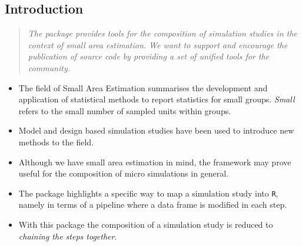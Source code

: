 \documentclass[a0,portrait]{a0poster}\usepackage[]{graphicx}\usepackage[]{color}
\newcommand{\mysec}[1]{\color{Black}\section*{#1}\color{DarkSlateGray}}
\newcommand{\code}[1]{\texttt{#1}}
\begin{document}
\begin{multicols}{2} %


\mysec{Introduction}

\begin{verse}
\textit{The package provides tools for the composition of simulation studies in the context of small area estimation. We want to support and encourage the publication of source code by providing a set of unified tools for the community.}
\end{verse}

\begin{multicols}{2}[\setlength{\columnseprule}{0pt}]

\begin{itemize}
  \item The field of Small Area Estimation summarises the development and application of statistical methods to report statistics for small groups. \textit{Small} refers to the small number of sampled units within groups.
  \item Model and design based simulation studies have been used to introduce new methods to the field.
  \item Although we have small area estimation in mind, the framework may prove useful for the composition of micro simulations in general.
  \item The package highlights a specific way to map a simulation study into \code{R}, namely in terms of a pipeline where a data frame is modified in each step. 
  \item With this package the composition of a simulation study is reduced to \textit{chaining the steps together}.
\end{itemize}

\columnbreak


\end{multicols}
\end{multicols}
\end{document}
